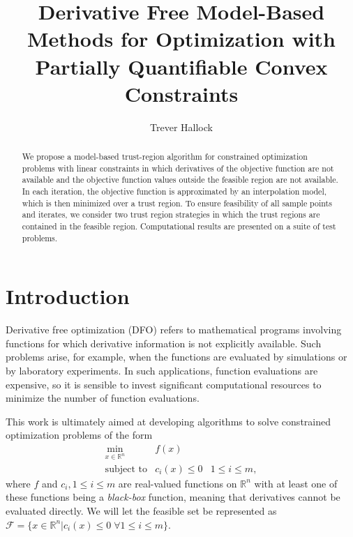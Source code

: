 \documentclass{article}
\title{Derivative Free Model-Based Methods for Optimization with Partially Quantifiable Convex Constraints}
\author{Trever Hallock}
\theoremstyle{case}
\newcommand{\domain}{{\mathcal X}}
\newcommand{\Rn}{\mathbb R^n}
\newcommand{\feasible}{{\mathcal F}}
\begin{document}
\maketitle

\begin{abstract}

We propose a model-based trust-region algorithm for constrained optimization problems with linear constraints in which derivatives of the objective function are not available and the objective function values outside the feasible region are not available.
In each iteration, the objective function is approximated by an interpolation model, which is then minimized over a trust region.
To ensure feasibility of all sample points and iterates, we consider two trust region strategies in which the trust regions are contained in the feasible region.
Computational results are presented on a suite of test problems.

\end{abstract}

\newpage

\tableofcontents

\newpage


\section{Introduction}

Derivative free optimization (DFO) refers to mathematical programs involving functions for which derivative information is not explicitly available.
Such problems arise, for example, when the functions are evaluated by simulations or by laboratory experiments.
In such applications, function evaluations are expensive, so it is sensible to invest significant computational resources to minimize the number of function evaluations.

This work is ultimately aimed at developing algorithms to solve constrained optimization problems of the form 
\[ \begin{array}{ccl} \min_{x \in \Rn} & f(x) \\
\mbox{subject to} & c_i(x) \le 0 & 1 \le i \le m,
\end{array}
\]
where 
$f$ and $c_i, 1 \le i \le m$ are real-valued functions on $\Rn$ with at least one of these functions being a {\em black-box} function, meaning that derivatives cannot be evaluated directly.
We will let the feasible set be represented as $\feasible = \{x \in \Rn | c_i(x) \le 0 \; \forall 1 \le i \le m \}$.
\end{document}
